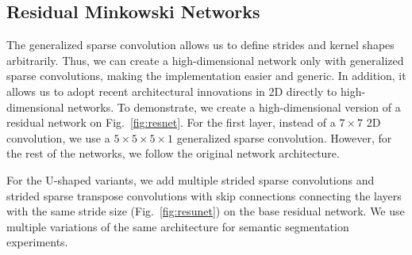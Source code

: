 \subsection{Residual Minkowski Networks}
The generalized sparse convolution allows us to define strides and kernel shapes arbitrarily. Thus, we can create a high-dimensional network only with generalized sparse convolutions, making the implementation easier and generic. In addition, it allows us to adopt recent architectural innovations in 2D directly to high-dimensional networks. To demonstrate, we create a high-dimensional version of a residual network on Fig.~\ref{fig:resnet}. For the first layer, instead of a $7 \times 7$ 2D convolution, we use a $5\times 5\times 5 \times 1$ generalized sparse convolution. However, for the rest of the networks, we follow the original network architecture.

For the U-shaped variants, we add multiple strided sparse convolutions and strided sparse transpose convolutions with skip connections connecting the layers with the same stride size (Fig.~\ref{fig:resunet}) on the base residual network. We use multiple variations of the same architecture for semantic segmentation experiments.
